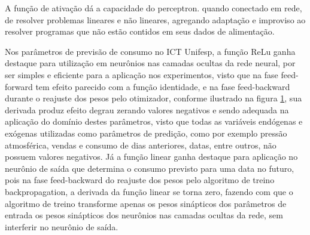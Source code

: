 		     A função de ativação dá a capacidade do perceptron. quando conectado em rede, de resolver problemas lineares e não lineares, agregando adaptação e improviso ao resolver programas que não estão contidos em seus dados de alimentação.
             
             Nos parâmetros de previsão de consumo no ICT Unifesp, a função ReLu ganha destaque para utilização em neurônios nas camadas ocultas da rede neural, por ser simples e eficiente para a aplicação nos experimentos, visto que na fase feed-forward tem efeito parecido com a função identidade, e na fase feed-backward durante o reajuste dos pesos pelo otimizador, conforme ilustrado na figura \ref{fig:ReLu}, sua derivada produz efeito degrau zerando valores negativos e sendo adequada na aplicação do domínio destes parâmetros, visto que todas as variáveis endógenas e exógenas utilizadas como parâmetros de predição, como por exemplo pressão atmosférica, vendas e consumo de dias anteriores, datas, entre outros, não possuem valores negativos. Já a função linear ganha destaque para aplicação no neurônio de saída que determina o consumo previsto para uma data no futuro, pois na fase feed-backward do reajuste dos pesos pelo algoritmo de treino backpropagation, a derivada da função linear se torna zero, fazendo com que o algoritmo de treino transforme apenas os pesos sinápticos dos parâmetros de entrada os pesos sinápticos dos neurônios nas camadas ocultas da rede, sem interferir no neurônio de saída.
             
              \begin{figure}[H]
        	 \label{fig:ReLu}
        \end{figure}
			
